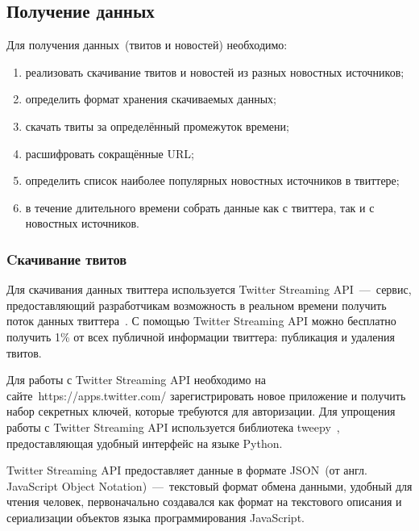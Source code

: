 \subsection{Получение данных}
    Для получения данных~(твитов и новостей) необходимо:
    \begin{enumerate}
        \item реализовать скачивание твитов и новостей из разных новостных источников;
        \item определить формат хранения скачиваемых данных;
        \item скачать твиты за определённый промежуток времени;
        \item расшифровать сокращённые URL;
        \item определить список наиболее популярных новостных источников в твиттере;
        \item в течение длительного времени собрать данные как с твиттера, так и с новостных источников.
    \end{enumerate}

    \subsubsection{Cкачивание твитов}
        Для скачивания данных твиттера используется Twitter Streaming API~---~сервис,
        предоставляющий разработчикам возможность в реальном времени получить поток данных твиттера~\cite{twitter_streaming}.
        С помощью Twitter Streaming API можно бесплатно получить 1\% от всех публичной информации твиттера: публикация и удаления твитов.

        Для работы с Twitter Streaming API необходимо на сайте~https://apps.twitter.com/ зарегистрировать новое приложение и получить набор секретных ключей,
        которые требуются для авторизации.
        Для упрощения работы с Twitter Streaming API используется библиотека tweepy~\cite{tweepy}, предоставляющая удобный интерфейс на языке Python.

        Twitter Streaming API предоставляет данные в формате JSON~(от англ. JavaScript Object Notation)~---~текстовый формат обмена данными, удобный для чтения человек,
        первоначально создавался как формат на текстового описания и сериализации объектов языка программирования JavaScript.

